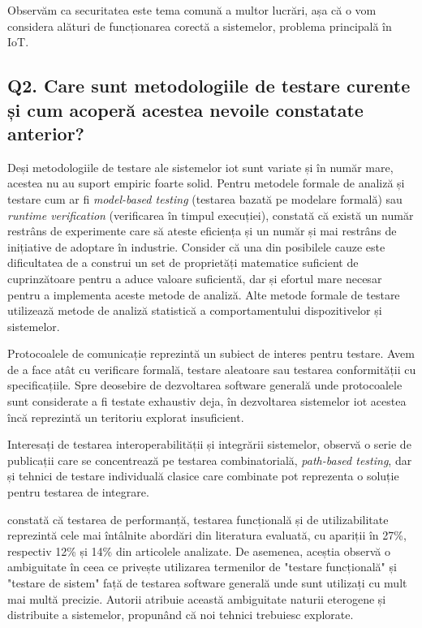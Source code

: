 Observăm ca securitatea este tema comună a multor lucrări, așa că o vom considera alături de funcționarea corectă a sistemelor, problema principală în IoT.


\subsection*{Q2. Care sunt metodologiile de testare curente și cum acoperă acestea nevoile constatate anterior?}

Deși metodologiile de testare ale sistemelor \acrshort{iot} sunt variate și în număr mare, acestea nu au suport empiric foarte solid. Pentru metodele formale de analiză și testare cum ar fi \textit{model-based testing} (testarea bazată pe modelare formală) sau \textit{runtime verification} (verificarea în timpul execuției), \citet{Ahmed2019} constată că există un număr restrâns de experimente care să ateste eficiența și un număr și mai restrâns de inițiative de adoptare în industrie. Consider că una din posibilele cauze este dificultatea de a construi un set de proprietăți matematice suficient de cuprinzătoare pentru a aduce valoare suficientă, dar și efortul mare necesar pentru a implementa aceste metode de analiză. Alte metode formale de testare utilizează metode de analiză statistică a comportamentului dispozitivelor și sistemelor. 

Protocoalele de comunicație reprezintă un subiect de interes pentru testare. Avem de a face atât cu verificare formală, testare aleatoare sau testarea conformității cu specificațiile. Spre deosebire de dezvoltarea software generală unde protocoalele sunt considerate a fi testate exhaustiv deja, în dezvoltarea sistemelor \acrshort{iot} acestea încă reprezintă un teritoriu explorat insuficient. 

Interesați de testarea interoperabilității și integrării sistemelor, \citet{Bures2020} observă o serie de publicații care se concentrează pe testarea combinatorială, \textit{path-based testing}, dar și tehnici de testare individuală clasice care combinate pot reprezenta o soluție pentru testarea de integrare. 

\citet{Corts2019} constată că testarea de performanță, testarea funcțională și de utilizabilitate reprezintă cele mai întâlnite abordări din literatura evaluată, cu apariții în 27\%, respectiv 12\% și 14\% din articolele analizate. De asemenea, aceștia observă o ambiguitate în ceea ce privește utilizarea termenilor de "testare funcțională" și "testare de sistem" față de testarea software generală unde sunt utilizați cu mult mai multă precizie. Autorii atribuie această ambiguitate naturii eterogene și distribuite a sistemelor, propunând că noi tehnici trebuiesc explorate. 

